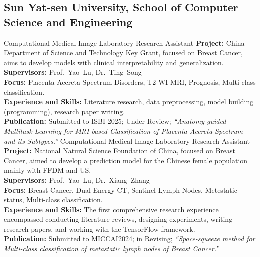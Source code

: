 \documentclass[11pt,a4paper, final]{moderncv}
\newcommand{\spacesubsection}{\vspace{0.2cm}}
\begin{document}
	\subsection{\textbf{Sun Yat-sen University, School of Computer Science and Engineering}}
		{Computational Medical Image Laboratory}
		{}
		{}{Research Assistant}
		{\fontsize{11pt}{14} \selectfont 
		\textbf{Project: }
		China Department of Science and Technology Key Grant, focused on Breast Cancer, 
		aims to develop models with clinical interpretability and generalization.\\
		\textbf{Supervisors: }
		Prof.~Yao~Lu, Dr.~Ting~Song
		\\
		\textbf{Focus: }
		Placenta Accreta Spectrum Disorders, T2-WI MRI, Prognosis, Multi-class classification.
		\\
		\textbf{Experience and Skills: }
		Literature research, data preprocessing, model building (programming), research paper writing.
		\\
		\textbf{Publication: }
		Submitted to ISBI 2025; Under Review; 
		\emph{“Anatomy-guided Multitask Learning for MRI-based Classification of Placenta Accreta Spectrum and its Subtypes.”}
		}
		{Computational Medical Image Laboratory}
		{}
		{}{Research Assistant}
		{\fontsize{11pt}{14} \selectfont 
		\textbf{Project: }
		National Natural Science Foundation of China, 
		focused on Breast Cancer, 
		aimed to develop a prediction model for the Chinese female population mainly with FFDM and US.\\
		\textbf{Supervisors: }
		Prof.~Yao~Lu, Dr.~Xiang~Zhang\\
		\textbf{Focus: }
		Breast Cancer, Dual-Energy CT, Sentinel Lymph Nodes, Metestatic status, Multi-class classification.\\
		\textbf{Experience and Skills: }
		The first comprehensive research experience encompassed conducting literature reviews, designing experiments, 
		writing research papers, and working with the TensorFlow framework.\\
		\textbf{Publication: }
		Submitted to MICCAI2024; in Revising; 
		\emph{“Space-squeeze method for Multi-class classification of metastatic lymph nodes of Breast Cancer.”}
		}
\end{document}
